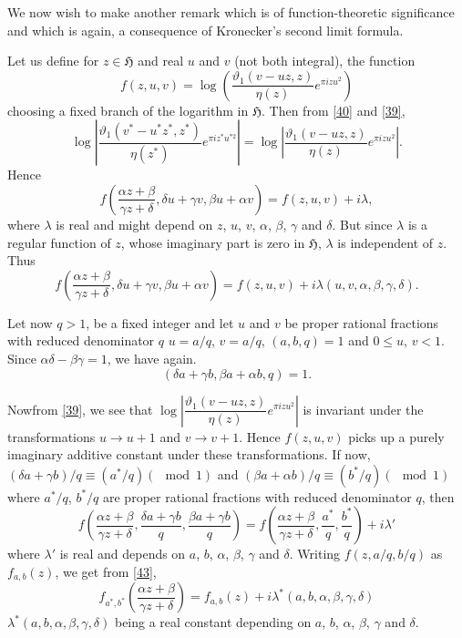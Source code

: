We now wish to make another remark which is of function-theoretic
significance and which is again, a consequence of Kronecker's second
limit formula.

Let us define for $z\in\mathfrak{H}$ and real $u$ and $v$ (not both
integral), the function
$$
f(z,u,v)=\log\left(\frac{\vartheta_{1}(v-uz,z)}{\eta(z)}e^{\pi izu^{2}}\right)
$$
choosing a fixed branch of the logarithm in $\mathfrak{H}$. Then from
\eqref{40} and \eqref{39},
$$
\log\left|\frac{\vartheta_{1}(v^{\ast}-u^{\ast}z^{\ast},z^{\ast})}{\eta(z^{\ast})}e^{\pi
  iz^{\ast}u^{\ast
    2}}\right|=\log\left|\frac{\vartheta_{1}(v-uz,z)}{\eta(z)}e^{\pi
  izu^{2}}\right|. 
$$
Hence
$$
f\left(\frac{\alpha z+\beta}{\gamma z+\delta}, \delta u+\gamma v,
\beta u+\alpha v\right)=f(z,u,v)+i\lambda,
$$
where $\lambda$ is real and might depend on $z$, $u$, $v$, $\alpha$,
$\beta$, $\gamma$ and $\delta$. But since $\lambda$ is a regular
function of $z$, whose imaginary part is zero in $\mathfrak{H}$,
$\lambda$ is independent of $z$. Thus
\begin{equation*}
f\left(\frac{\alpha z+\beta}{\gamma z+\delta},\delta u+\gamma v,\beta
u+\alpha
v\right)=f(z,u,v)+i\lambda(u,v,\alpha,\beta,\gamma,\delta).\tag{43}\label{43} 
\end{equation*}

Let now $q>1$, be a fixed integer and let $u$ and $v$ be proper
rational fractions with reduced denominator $q$ \ie $u=a/q$, $v=a/q$,
$(a,b,q)=1$ and $0\leq u$, $v<1$. Since $\alpha\delta-\beta\gamma=1$,
we have again.
$$
(\delta a+\gamma b, \beta a+\alpha b,q)=1.
$$

Now\pageoriginale from \eqref{39}, we see that
$\log\left|\dfrac{\vartheta_{1}(v-uz,z)}{\eta(z)}e^{\pi
  izu^{2}}\right|$ is invariant under the transformations $u\to u+1$
and $v\to v+1$. Hence $f(z,u,v)$ picks up a purely imaginary additive
constant under these transformations. If now, $(\delta a+\gamma
b)/q\equiv (a^{\ast}/q)(\mod 1)$ and $(\beta a+\alpha b)/q\equiv
(b^{\ast}/q)(\mod 1)$ where $a^{\ast}/q$, $b^{\ast}/q$ are proper
rational fractions with reduced denominator $q$, then
$$
f\left(\frac{\alpha z+\beta}{\gamma z+\delta}, \frac{\delta a+\gamma
  b}{q},\frac{\beta a+\gamma b}{q}\right)=f\left(\frac{\alpha
  z+\beta}{\gamma z+\delta},
\frac{a^{\ast}}{q},\frac{b^{\ast}}{q}\right)+i\lambda' 
$$
where $\lambda'$ is real and depends on $a$, $b$, $\alpha$, $\beta$,
$\gamma$ and $\delta$. Writing $f(z,a/q,b/q)$ as $f_{a,b}(z)$, we get
from \eqref{43},
\begin{equation*}
f_{a^{\ast},b^{\ast}}\left(\frac{\alpha z+\beta}{\gamma
  z+\delta}\right)=f_{a,b}(z)+i\lambda^{\ast}(a,b,\alpha,\beta,\gamma,\delta)\tag{44}\label{44}
\end{equation*}
$\lambda^{\ast}(a,b,\alpha,\beta,\gamma,\delta)$ being a real constant
depending on $a$, $b$, $\alpha$, $\beta$, $\gamma$ and $\delta$. 

